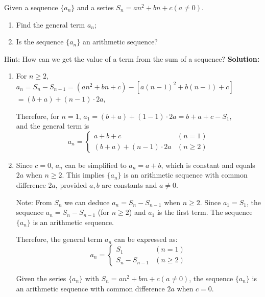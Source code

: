 \documentclass[
	12pt, %
	fleqn, %
	a4paper, %
]{LegrandOrangeBook}
\begin{document}
\begin{exercise}
    Given a sequence \( \{a_n\} \) and a series \( S_n = an^2 + bn + c (a \neq 0) \).

\begin{enumerate}
    \item Find the general term \( a_n \);
    \item Is the sequence \( \{a_n\} \) an arithmetic sequence?
\end{enumerate}
\end{exercise}
Hint: How can we get the value of a term from the sum of a sequence?
\textbf{Solution:}

\begin{enumerate}
    \item For \( n \geq 2 \), \( a_n = S_n - S_{n-1} = (an^2 + bn + c) - [a(n-1)^2 + b(n-1) + c] \) \\
    \( = (b+a) + (n-1) \cdot 2a \),
    
    Therefore, for \( n=1 \), \( a_1 = (b+a) + (1-1) \cdot 2a = b + a + c - S_1 \), \\
    and the general term is
    \[
    a_n = 
    \begin{cases}
        a + b + c & (n=1) \\
        (b+a) + (n-1) \cdot 2a & (n \geq 2)
    \end{cases}
    \]

    \item Since \( c = 0 \), \( a_n \) can be simplified to \( a_n = a + b \), which is constant and equals \( 2a \) when \( n \geq 2 \). This implies \( \{a_n\} \) is an arithmetic sequence with common difference \( 2a \), provided \( a, b \) are constants and \( a \neq 0 \).
    
    Note: From \( S_n \) we can deduce \( a_n = S_n - S_{n-1} \) when \( n \geq 2 \). Since \( a_1 = S_1 \), the sequence \( a_n = S_n - S_{n-1} \) (for \( n \geq 2 \)) and \( a_1 \) is the first term. The sequence \( \{a_n\} \) is an arithmetic sequence.
    
    Therefore, the general term \( a_n \) can be expressed as:
    \[
    a_n = 
    \begin{cases}
        S_1 & (n=1) \\
        S_n - S_{n-1} & (n \geq 2)
    \end{cases}
    \]
    
    Given the series \( \{a_n\} \) with \( S_n = an^2 + bm + c (a \neq 0) \), the sequence \( \{a_n\} \) is an arithmetic sequence with common difference \( 2a \) when \( c = 0 \).
\end{enumerate}
\end{document}
